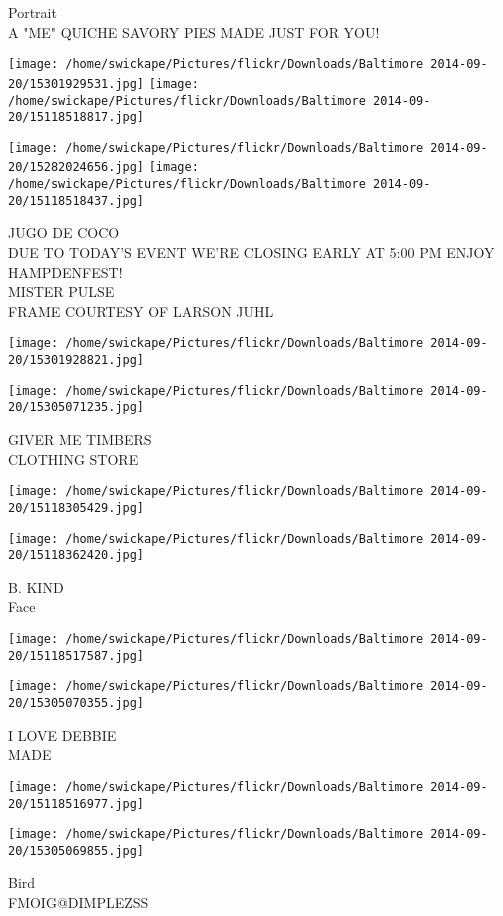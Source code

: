 \documentclass[10pt,letterpaper]{article}
\begin{document}
Portrait\\
A "ME" QUICHE SAVORY PIES MADE JUST FOR YOU!\\
\pagebreak

\texttt{[image: /home/swickape/Pictures/flickr/Downloads/Baltimore 2014-09-20/15301929531.jpg]}
\texttt{[image: /home/swickape/Pictures/flickr/Downloads/Baltimore 2014-09-20/15118518817.jpg]}

\texttt{[image: /home/swickape/Pictures/flickr/Downloads/Baltimore 2014-09-20/15282024656.jpg]}
\texttt{[image: /home/swickape/Pictures/flickr/Downloads/Baltimore 2014-09-20/15118518437.jpg]}

JUGO DE COCO\\
DUE TO TODAY'S EVENT WE'RE CLOSING EARLY AT 5:00 PM ENJOY HAMPDENFEST!\\
MISTER PULSE\\
FRAME COURTESY OF LARSON JUHL\\
\pagebreak

\texttt{[image: /home/swickape/Pictures/flickr/Downloads/Baltimore 2014-09-20/15301928821.jpg]}

\vspace{0.25in}
\texttt{[image: /home/swickape/Pictures/flickr/Downloads/Baltimore 2014-09-20/15305071235.jpg]}

GIVER ME TIMBERS\\
CLOTHING STORE\\
\pagebreak

\texttt{[image: /home/swickape/Pictures/flickr/Downloads/Baltimore 2014-09-20/15118305429.jpg]}

\vspace{0.25in}
\texttt{[image: /home/swickape/Pictures/flickr/Downloads/Baltimore 2014-09-20/15118362420.jpg]}

B. KIND\\
Face\\
\pagebreak

\texttt{[image: /home/swickape/Pictures/flickr/Downloads/Baltimore 2014-09-20/15118517587.jpg]}

\vspace{0.25in}
\texttt{[image: /home/swickape/Pictures/flickr/Downloads/Baltimore 2014-09-20/15305070355.jpg]}

I LOVE DEBBIE\\
MADE\\
\pagebreak

\texttt{[image: /home/swickape/Pictures/flickr/Downloads/Baltimore 2014-09-20/15118516977.jpg]}

\vspace{0.25in}
\texttt{[image: /home/swickape/Pictures/flickr/Downloads/Baltimore 2014-09-20/15305069855.jpg]}

Bird\\
FMOIG@DIMPLEZSS\\
\pagebreak
\end{document}
